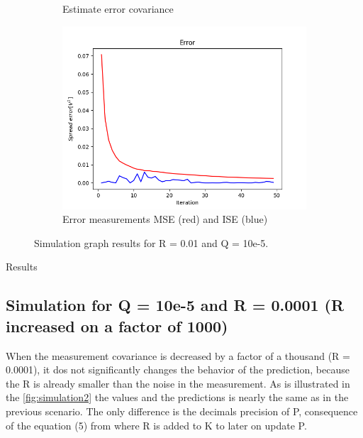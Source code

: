 \documentclass{article}
\begin{document}
\begin{figure}
\begin{subfigure} {.5\textwidth}
            \caption{Estimate error covariance}
        \end{subfigure}
        \begin{subfigure}{.5\textwidth}            
            \centering
            \includegraphics[width=0.8\linewidth]{./img/r01q_E.png}
            \caption{Error measurements MSE (red) and ISE (blue)}
        \end{subfigure}
        \caption{Simulation graph results for R = 0.01 and Q = 10e-5.}
        \label{fig:simulation1}
    \end{figure}
    
    

    Results

    \subsection{Simulation for Q = 10e-5 and R = 0.0001 (R increased on a factor of 1000)} 
    
    When the measurement covariance is decreased by a factor of a thousand (R = 0.0001), it dos not 
    significantly changes the behavior of the prediction, because the R is already smaller than the noise
    in the measurement. As is illustrated in the \ref{fig:simulation2} the values and the predictions is nearly
    the same as in the previous scenario. The only difference is the decimals precision of P,  consequence
    of the equation (5) from \cite{LabManual} where R is added to K to later on update P.
\end{document}
